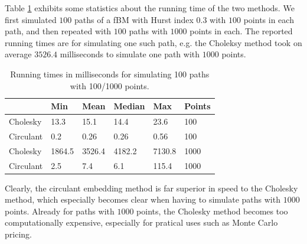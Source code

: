 Table \ref{Tab:Tcr} exhibits some statistics about the running time of the two methods. We first simulated $100$ paths of a fBM with Hurst index $0.3$ with $100$ points in each path, and then repeated with $100$ paths with $1000$ points in each. The reported running times are for simulating one such path, e.g. the Choleksy method took on average $3526.4$ milliseconds to simulate one path with $1000$ points.
\begin{table}[H]
\centering
\begin{tabular}{llllll}\toprule

        & Min    & Mean   & Median & Max    & Points  \\ \hline
Cholesky  & 13.3 & 15.1 & 14.4 & 23.6 & 100 \\
Circulant & 0.2    & 0.26    & 0.26    & 0.56 & 100 \\ \midrule
Cholesky  & 1864.5 & 3526.4 & 4182.2 & 7130.8 & 1000 \\
Circulant & 2.5    & 7.4    & 6.1    & 115.4  & 1000 \\
\bottomrule
\end{tabular}
\caption{Running times in milliseconds for simulating 100 paths with 100/1000 points.}
\label{Tab:Tcr}
\end{table}

Clearly, the circulant embedding method is far superior in speed to the Cholesky method, which especially becomes clear when having to simulate paths with $1000$ points. Already for paths with $1000$ points, the Cholesky method becomes too computationally expensive, especially for pratical uses such as Monte Carlo pricing.



